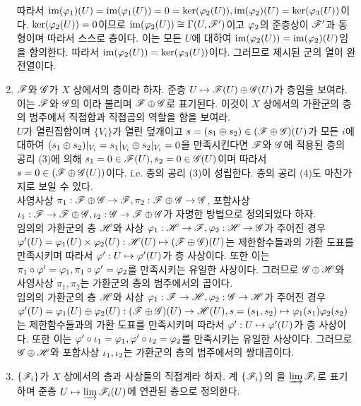 \begin{enumerate}[label=\tb{1.\arabic*.},itemindent=0mm,itemsep=4mm]
	따라서 $\operatorname{im}(\varphi_1)(U)=\operatorname{im}(\varphi_1(U))=0=\ker(\varphi_2(U)),\operatorname{im}(\varphi_2)(U)=\ker(\varphi_3(U))$이다.
	$\ker(\varphi_2(U))=0$이므로 $\operatorname{im}(\varphi_2(U))\cong\Gamma(U,\mathscr{F}')$이고 $\varphi_2$의 준층상이 $\mathscr{F}'$과 동형이며 따라서 스스로 층이다.
	이는 모든 $U$에 대하여 $\operatorname{im}(\varphi_2(U))=\operatorname{im}(\varphi_2)(U)$임을 함의한다. 따라서 $\operatorname{im}(\varphi_2(U))=\ker(\varphi_3(U))$이다.
	그러므로 제시된 군의 열이 완전열이다.
	\item {} $\mathscr{F}$와 $\mathscr{G}$가 $X$ 상에서의 층이라 하자. 준층 $U\mapsto\mathscr{F}(U)\oplus\mathscr{G}(U)$가 층임을 보여라.
	이는 $\mathscr{F}$와 $\mathscr{G}$의 이라 불리며 $\mathscr{F}\oplus\mathscr{G}$로 표기된다.
	이것이 $X$ 상에서의 가환군의 층의 범주에서 직접합과 직접곱의 역할을 함을 보여라.\\
	\sol $U$가 열린집합이며 $\{V_i\}$가 열린 덮개이고 $s=(s_1\oplus s_2)\in(\mathscr{F}\oplus\mathscr{G})(U)$가 모든 $i$에 대하여
	$(s_1\oplus s_2)|_{V_i}=s_1|_{V_i}\oplus s_2|_{V_i}=0$을 만족시킨다면
	$\mathscr{F}$와 $\mathscr{G}$에 적용된 층의 공리 (3)에 의해 $s_1=0\in\mathscr{F}(U),s_2=0\in\mathscr{G}(U)$이며
	따라서 $s=0\in(\mathscr{F}\oplus\mathscr{G}(U))$이다. i.e. 층의 공리 (3)이 성립한다. 층의 공리 (4)도 마찬가지로 보일 수 있다.\\
	사영사상 $\pi_1:\mathscr{F}\oplus\mathscr{G}\rightarrow\mathscr{F},\pi_2:\mathscr{F}\oplus\mathscr{G}\rightarrow\mathscr{G}$,
	포함사상 $\iota_1:\mathscr{F}\rightarrow\mathscr{F}\oplus\mathscr{G},\iota_2:\mathscr{G}\rightarrow\mathscr{F}\oplus\mathscr{G}$가 자명한 방법으로 정의되었다 하자.\\
	임의의 가환군의 층 $\mathscr{H}$와 사상 $\varphi_1:\mathscr{H}\rightarrow\mathscr{F},\varphi_2:\mathscr{H}\rightarrow\mathscr{G}$가 주어진 경우
	$\varphi'(U)=\varphi_1(U)\times\varphi_2(U):\mathscr{H}(U)\mapsto(\mathscr{F}\oplus\mathscr{G})(U)$는 제한함수들과의 가환 도표를 만족시키며
	따라서 $\varphi':U\mapsto\varphi'(U)$가 층 사상이다. 또한 이는 $\pi_1\circ\varphi'=\varphi_1,\pi_1\circ\varphi'=\varphi_2$를 만족시키는 유일한 사상이다.
	그러므로 $\mathscr{G}\oplus\mathscr{H}$와 사영사상 $\pi_1,\pi_2$는 가환군의 층의 범주에서의 곱이다.\\
	임의의 가환군의 층 $\mathscr{H}$와 사상 $\varphi_1:\mathscr{F}\rightarrow\mathscr{H},\varphi_2:\mathscr{G}\rightarrow\mathscr{H}$가 주어진 경우
	$\varphi'(U)=\varphi_1(U)\oplus\varphi_2(U):(\mathscr{F}\oplus\mathscr{G})(U)\rightarrow\mathscr{H}(U),s=(s_1,s_2)\mapsto\varphi_1(s_1)\varphi_2(s_2)$는
	제한함수들과의 가환 도표를 만족시키며 따라서 $\varphi':U\mapsto\varphi'(U)$가 층 사상이다.
	또한 이는 $\varphi'\circ\iota_1=\varphi_1,\varphi'\circ\iota_2=\varphi_2$를 만족시키는 유일한 사상이다.
	그러므로 $\mathscr{G}\oplus\mathscr{H}$와 포함사상 $\iota_1,\iota_2$는 가환군의 층의 범주에서의 쌍대곱이다.
	\item {} $\{\mathscr{F}_i\}$가 $X$ 상에서의 층과 사상들의 직접계라 하자.
	계 $\{\mathscr{F}_i\}$의 을 $\varinjlim\mathscr{F}_i$로 표기하며
	준층 $U\mapsto\varinjlim\mathscr{F}_i(U)$에 연관된 층으로 정의한다.

\end{enumerate}
